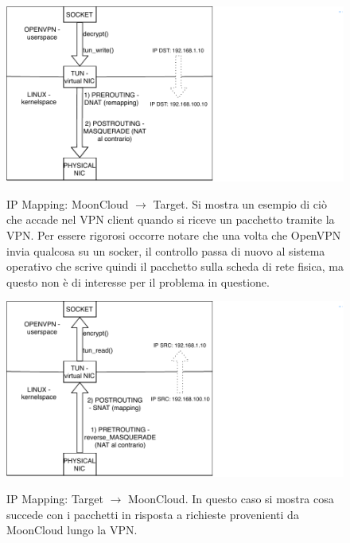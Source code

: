 \begin{figure} 
  \includegraphics[scale=0.7]{img/ip_mapping_send}
  \label{fig:ip-mapping-send}
  \caption[IP Mapping: MoonCloud $\rightarrow$ Target]{
    IP Mapping: MoonCloud $\rightarrow$ Target. Si mostra un esempio di ciò che
    accade nel VPN client quando si riceve un pacchetto tramite la VPN.
    Per essere rigorosi occorre notare che una volta che OpenVPN invia qualcosa
    su un socker, il controllo passa di nuovo al sistema operativo che scrive
    quindi il pacchetto sulla scheda di rete fisica, ma questo non è di interesse
    per il problema in questione.}
\end{figure}

\begin{figure}
  \includegraphics[scale=0.7]{img/ip_mapping_recv}
  \label{fig:ip-mapping-recv}
  \caption[IP Mapping: Target $\rightarrow$ MoonCloud]{
    IP Mapping: Target $\rightarrow$ MoonCloud. In questo caso si mostra
    cosa succede con i pacchetti in risposta a richieste provenienti
    da MoonCloud lungo la VPN.}
\end{figure}
